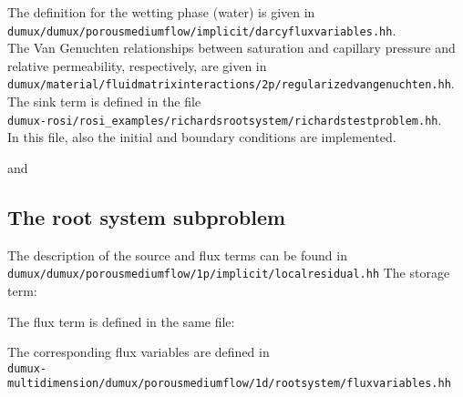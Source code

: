 The  definition for the wetting phase (water) is given in\\
\verb+dumux/dumux/porousmediumflow/implicit/darcyfluxvariables.hh+. \\
	

The Van Genuchten relationships between saturation and capillary pressure and relative permeability, respectively, are given in \\
\verb+dumux/material/fluidmatrixinteractions/2p/regularizedvangenuchten.hh+.\\

The sink term is defined in the file\\ 
\verb+dumux-rosi/rosi_examples/richardsrootsystem/richardstestproblem.hh+.\\
	

In this file, also the initial and boundary conditions are implemented.
	
and
	


\subsection*{The root system subproblem}

The description of the source and flux terms can be found in \\
\verb+dumux/dumux/porousmediumflow/1p/implicit/localresidual.hh+
The storage term: 
	

The flux term is defined in the same file:
	

The corresponding flux variables are defined in \\
\verb+dumux-multidimension/dumux/porousmediumflow/1d/rootsystem/fluxvariables.hh+\\

